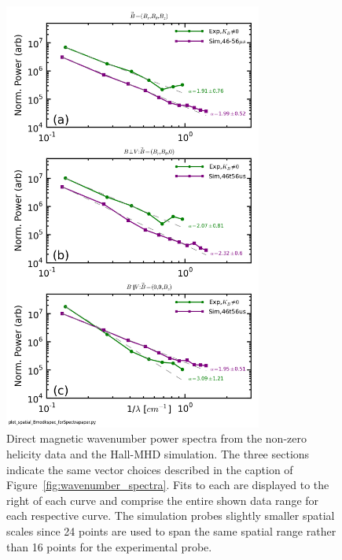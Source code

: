 \documentclass[aip,prl,amsmath,amssymb,reprint,superscriptaddress]{revtex4-1} %
\begin{document}
\begin{figure}[!htbp]
\centerline{
\includegraphics[width=8.5cm]{Bmod_FFTwavenumberspectra_wFits_40t60us_simulationcomparison}}
\caption{\label{fig:sim_wavenumber_comp} Direct magnetic wavenumber power spectra from the non-zero helicity data and the Hall-MHD simulation. The three sections indicate the same vector choices described in the caption of Figure~\ref{fig:wavenumber_spectra}. Fits to each are displayed to the right of each curve and comprise the entire shown data range for each respective curve. The simulation probes slightly smaller spatial scales since 24 points are used to span the same spatial range rather than 16 points for the experimental probe.}
\end{figure}
\end{document}
